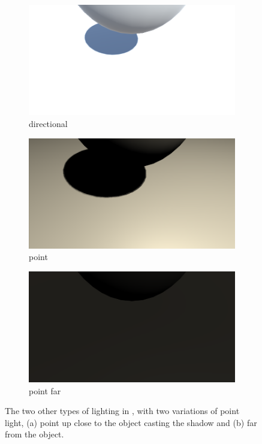 \begin{figure}
\centering
\begin{subfigure}[t]{0.33\textwidth}
\centering
\includegraphics[width=\linewidth]{figures/shadows/directional-cleaned}
\caption{directional}
\label{fig:directional}
\end{subfigure}%
    \hfill
\begin{subfigure}[t]{0.33\textwidth}
\centering
\includegraphics[width=\linewidth]{figures/shadows/point-cleaned}
\caption{point}
\label{fig:point}
\end{subfigure}%
    \hfill
\begin{subfigure}[t]{0.33\textwidth}
\centering
\includegraphics[width=\linewidth]{figures/shadows/point-far-cleaned}
\caption{point far}
\label{fig:point-far}
\end{subfigure}%

\caption{
The two other types of lighting in \cite{unitylighttypes}, with two variations of point light, (a) point up close to the object casting the shadow and (b) far from the object.
}
\label{fig:rest-analysis}
\end{figure}


